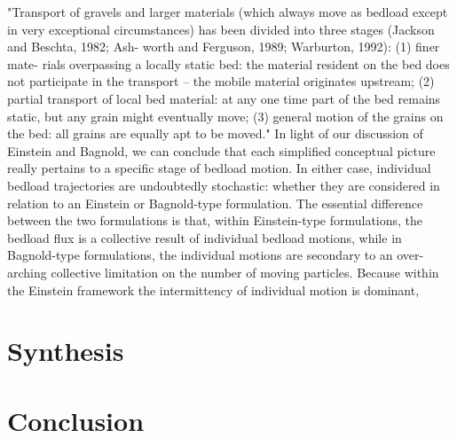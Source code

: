 \documentclass{article}
\begin{document}
"Transport of gravels and larger materials (which always move as bedload except in very exceptional circumstances) has been divided into three stages (Jackson and Beschta, 1982; Ash- worth and Ferguson, 1989; Warburton, 1992): (1) finer mate- rials overpassing a locally static bed: the material resident on the bed does not participate in the transport – the mobile material originates upstream; (2) partial transport of local bed material: at any one time part of the bed remains static, but any grain might eventually move; (3) general motion of the grains on the bed: all grains are equally apt to be moved."
In light of our discussion of Einstein and Bagnold, we can conclude that each simplified conceptual picture really pertains to a specific stage of bedload motion. 
In either case, individual bedload trajectories are undoubtedly stochastic: whether they are considered in relation to an Einstein or Bagnold-type formulation. 
The essential difference between the two formulations is that, within Einstein-type formulations, the bedload flux is a collective result of individual bedload motions, while in Bagnold-type formulations, the individual motions are secondary to an over-arching collective limitation on the number of moving particles. 
Because within the Einstein framework the intermittency of individual motion is dominant,

\section{Synthesis}

\section{Conclusion} 
\end{document}
